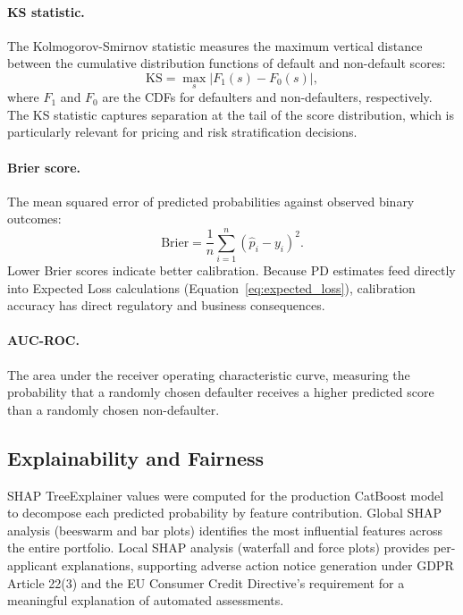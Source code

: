 \documentclass[11pt, a4paper]{article}
\begin{document}
\paragraph{KS statistic.} The Kolmogorov-Smirnov statistic measures the maximum vertical distance between the cumulative distribution functions of default and non-default scores:
\begin{equation}
\text{KS} = \max_s \bigl|F_1(s) - F_0(s)\bigr|,
\end{equation}
where $F_1$ and $F_0$ are the CDFs for defaulters and non-defaulters, respectively. The KS statistic captures separation at the tail of the score distribution, which is particularly relevant for pricing and risk stratification decisions.

\paragraph{Brier score.} The mean squared error of predicted probabilities against observed binary outcomes:
\begin{equation}
\text{Brier} = \frac{1}{n}\sum_{i=1}^{n}(\hat{p}_i - y_i)^2.
\end{equation}
Lower Brier scores indicate better calibration. Because PD estimates feed directly into Expected Loss calculations (Equation~\ref{eq:expected_loss}), calibration accuracy has direct regulatory and business consequences.

\paragraph{AUC-ROC.} The area under the receiver operating characteristic curve, measuring the probability that a randomly chosen defaulter receives a higher predicted score than a randomly chosen non-defaulter.

\subsection{Explainability and Fairness}

SHAP TreeExplainer values were computed for the production CatBoost model to decompose each predicted probability by feature contribution. Global SHAP analysis (beeswarm and bar plots) identifies the most influential features across the entire portfolio. Local SHAP analysis (waterfall and force plots) provides per-applicant explanations, supporting adverse action notice generation under GDPR Article 22(3) and the EU Consumer Credit Directive's requirement for a meaningful explanation of automated assessments.
\end{document}
